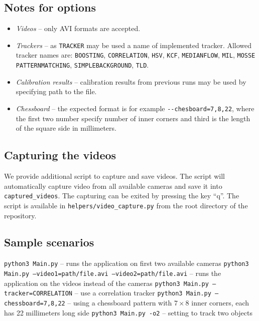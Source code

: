 \subsection{Notes for options}
\begin{itemize}
\item\emph{Videos} -- only AVI formats are accepted.
\item\emph{Trackers} -- as \verb+TRACKER+ may be used a name of implemented tracker.
Allowed tracker names are: 
\verb+BOOSTING+,
\verb+CORRELATION+,
\verb+HSV+,
\verb+KCF+,
\verb+MEDIANFLOW+,
\verb+MIL+,
\verb+MOSSE+
\verb+PATTERNMATCHING+,
\verb+SIMPLEBACKGROUND+,
\verb+TLD+.
\item\emph{Calibration results} -- calibration results from previous runs may be
used by specifying path to the file.
\item\emph{Chessboard} -- the expected format is for example
\verb+--chesboard=7,8,22+, where the first two number specify number of inner
corners and third is the length of the square side in millimeters.
\end{itemize}

\subsection{Capturing the videos} 

We provide additional script to capture and save videos. The script will
automatically capture video from all available cameras and save it into
\verb+captured_videos+. The capturing can be exited by pressing the key ``q''.
The script is available in \texttt{helpers/video\_capture.py} from the root
directory of the repository.  

\subsection{Sample scenarios}

\texttt{python3 Main.py} -- runs the application on first two available cameras
\newline
\texttt{python3 Main.py --video1=path/file.avi --video2=path/file.avi} -- runs the application on the videos instead of the cameras
\newline
\texttt{python3 Main.py --tracker=CORRELATION} -- use a correlation tracker
\newline
\texttt{python3 Main.py --chessboard=7,8,22} -- using a chessboard pattern with $7\times8$ inner corners, each has 22 millimeters long side
\newline
\texttt{python3 Main.py -o2} -- setting to track two objects
